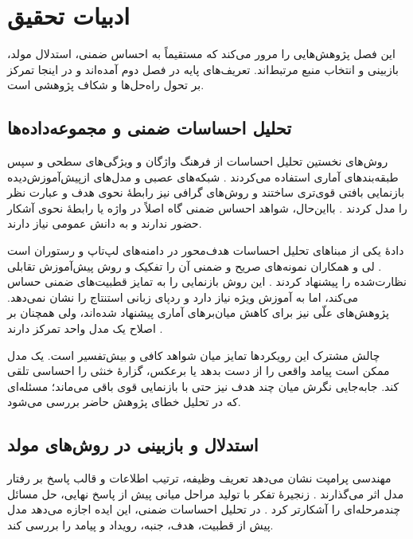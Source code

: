 \chapter{ادبیات تحقیق}

این فصل پژوهش‌هایی را مرور می‌کند که مستقیماً به احساس ضمنی، استدلال مولد، بازبینی و انتخاب منبع مرتبط‌اند. تعریف‌های پایه در فصل دوم آمده‌اند و در اینجا تمرکز بر تحول راه‌حل‌ها و شکاف پژوهشی است.

\section{تحلیل احساسات ضمنی و مجموعه‌داده‌ها}

روش‌های نخستین تحلیل احساسات از فرهنگ واژگان و ویژگی‌های سطحی و سپس طبقه‌بندهای آماری استفاده می‌کردند \cite{pang2008opinion,wankhade2022survey}. شبکه‌های عصبی و مدل‌های ازپیش‌آموزش‌دیده بازنمایی بافتی قوی‌تری ساختند و روش‌های گرافی نیز رابطۀ نحوی هدف و عبارت نظر را مدل کردند \cite{wang2020rgat}. بااین‌حال، شواهد احساس ضمنی گاه اصلاً در واژه یا رابطۀ نحوی آشکار حضور ندارند و به دانش عمومی نیاز دارند.

دادۀ  یکی از مبناهای تحلیل احساسات هدف‌محور در دامنه‌های لپ‌تاپ و رستوران است \cite{pontiki2014semeval}. لی و همکاران نمونه‌های صریح و ضمنی آن را تفکیک و روش پیش‌آموزش تقابلی نظارت‌شده  را پیشنهاد کردند \cite{li2021scapt}. این روش بازنمایی را به تمایز قطبیت‌های ضمنی حساس می‌کند، اما به آموزش ویژه نیاز دارد و ردپای زبانی استنتاج را نشان نمی‌دهد. پژوهش‌های علّی نیز برای کاهش میان‌برهای آماری پیشنهاد شده‌اند، ولی همچنان بر اصلاح یک مدل واحد تمرکز دارند \cite{wang2022causal}.

چالش مشترک این رویکردها تمایز میان شواهد کافی و بیش‌تفسیر است. یک مدل ممکن است پیامد واقعی را از دست بدهد یا برعکس، گزارۀ خنثی را احساسی تلقی کند. جابه‌جایی نگرش میان چند هدف نیز حتی با بازنمایی قوی باقی می‌ماند؛ مسئله‌ای که در تحلیل خطای پژوهش حاضر بررسی می‌شود.

\section{استدلال و بازبینی در روش‌های مولد}

مهندسی پرامپت نشان می‌دهد تعریف وظیفه، ترتیب اطلاعات و قالب پاسخ بر رفتار مدل اثر می‌گذارند \cite{liu2023prompting}. زنجیرۀ تفکر با تولید مراحل میانی پیش از پاسخ نهایی، حل مسائل چندمرحله‌ای را آشکارتر کرد \cite{wei2022cot}. در تحلیل احساسات ضمنی، این ایده اجازه می‌دهد مدل پیش از قطبیت، هدف، جنبه، رویداد و پیامد را بررسی کند.

